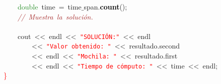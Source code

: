 \mbox{}\ \ \ \ \textcolor{ForestGreen}{double}\ time\ \textcolor{BrickRed}{=}\ time$\_$span\textcolor{BrickRed}{.}\textbf{\textcolor{Black}{count}}\textcolor{BrickRed}{();} \\
\mbox{}\ \ \ \ \textit{\textcolor{Brown}{//\ Muestra\ la\ solución.}} \\
\mbox{}\ \ \ \  \\
\mbox{}\ \ \ \ cout\ \textcolor{BrickRed}{\textless{}\textless{}}\ endl\ \textcolor{BrickRed}{\textless{}\textless{}}\ \texttt{\textcolor{Red}{"{}SOLUCIÓN:"{}}}\ \textcolor{BrickRed}{\textless{}\textless{}}\ endl \\
\mbox{}\ \ \ \ \ \ \ \ \textcolor{BrickRed}{\textless{}\textless{}}\ \texttt{\textcolor{Red}{"{}Valor\ obtenido:\ "{}}}\ \textcolor{BrickRed}{\textless{}\textless{}}\ resultado\textcolor{BrickRed}{.}second \\
\mbox{}\ \ \ \ \ \ \ \ \textcolor{BrickRed}{\textless{}\textless{}}\ endl\ \textcolor{BrickRed}{\textless{}\textless{}}\ \texttt{\textcolor{Red}{"{}Mochila:\ "{}}}\ \textcolor{BrickRed}{\textless{}\textless{}}\ resultado\textcolor{BrickRed}{.}first \\
\mbox{}\ \ \ \ \ \ \ \ \textcolor{BrickRed}{\textless{}\textless{}}\ endl\ \textcolor{BrickRed}{\textless{}\textless{}}\ \texttt{\textcolor{Red}{"{}Tiempo\ de\ cómputo:\ "{}}}\ \textcolor{BrickRed}{\textless{}\textless{}}\ time\ \textcolor{BrickRed}{\textless{}\textless{}}\ endl\textcolor{BrickRed}{;} \\
\mbox{}\textcolor{Red}{\}} \\
\mbox{}
